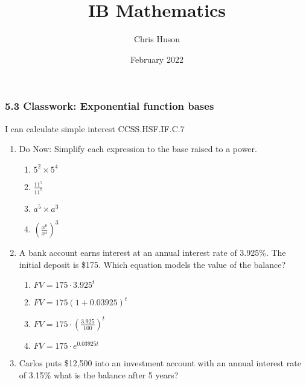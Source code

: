 \documentclass[12pt, twoside]{article}
\title{IB Mathematics}
\author{Chris Huson}
\date{February 2022}
\begin{document}
\subsubsection*{5.3 Classwork: Exponential function bases}
I can calculate simple interest \hfill CCSS.HSF.IF.C.7

\begin{enumerate}
\item Do Now: Simplify each expression to the base raised to a power.
    \begin{multicols}{2}
    \begin{enumerate}[itemsep=0.5cm]
        \item $5^2 \times 5^4$
        \item $\displaystyle \frac{11^7}{11^5}$
        \item $a^5 \times a^3$
        \item $\displaystyle \left( \frac{x^6}{x^4}\right)^{3}$
    \end{enumerate}
    \end{multicols}

\item A bank account earns interest at an annual interest rate of 3.925\%. The initial deposit is \$175. Which equation models the value of the balance?
\begin{multicols}{2}
    \begin{enumerate}[itemsep=0.5cm]
        \item $FV=175 \cdot 3.925^{t}$
        \item $FV=175 (1+0.03925)^{t}$
        \item $\displaystyle FV=175 \cdot \left( \frac{3.925}{100}\right)^{t}$
        \item $FV=175 \cdot e^{0.03925t}$
    \end{enumerate}
\end{multicols}

\item Carlos puts \$12,500 into an investment account with an annual interest rate of 3.15\% what is the balance after 5 years? \vspace{2cm}


\end{enumerate}
\end{document}
